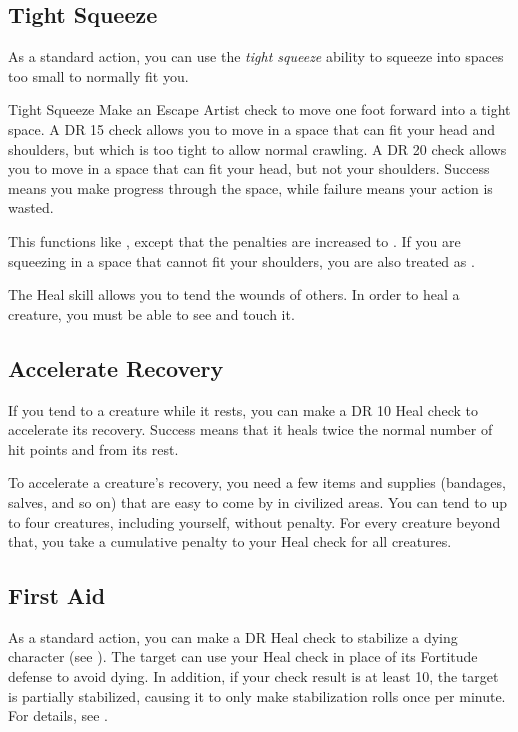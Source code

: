     \subsection{Tight Squeeze}
        As a standard action, you can use the \textit{tight squeeze} ability to squeeze into spaces too small to normally fit you.
        \begin{ability}{Tight Squeeze}
            Make an Escape Artist check to move one foot forward into a tight space.
            A DR 15 check allows you to move in a space that can fit your head and shoulders, but which is too tight to allow normal crawling.
            A DR 20 check allows you to move in a space that can fit your head, but not your shoulders.
            Success means you make progress through the space, while failure means your action is wasted.

            This functions like , except that the penalties are increased to .
            If you are squeezing in a space that cannot fit your shoulders, you are also treated as .
        \end{ability}

\newpage
{}
        The Heal skill allows you to tend the wounds of others. In order to heal a creature, you must be able to see and touch it.

    \subsection{Accelerate Recovery}\label{Accelerate Recovery}
        If you tend to a creature while it rests, you can make a DR 10 Heal check to accelerate its recovery.
        Success means that it heals twice the normal number of hit points and  from its rest.

        To accelerate a creature's recovery, you need a few items and supplies (bandages, salves, and so on) that are easy to come by in civilized areas.
        You can tend to up to four creatures, including yourself, without penalty.
        For every creature beyond that, you take a cumulative  penalty to your Heal check for all creatures.

    \subsection{First Aid}
        As a standard action, you can make a DR Heal check to stabilize a dying character (see ). The target can use your Heal check in place of its Fortitude defense to avoid dying. In addition, if your check result is at least 10, the target is partially stabilized, causing it to only make stabilization rolls once per minute.
        For details, see .

